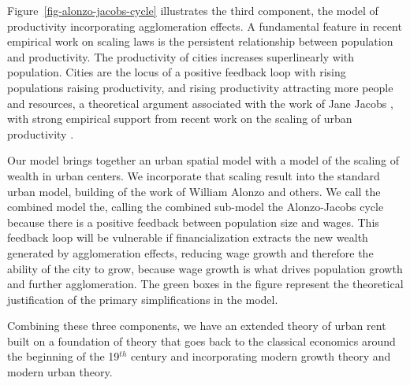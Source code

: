 Figure~\ref{fig-alonzo-jacobs-cycle} illustrates the third component, the model of productivity incorporating agglomeration effects. %
A fundamental feature in recent empirical work on scaling laws is %
the persistent relationship between population and productivity. The productivity of cities increases superlinearly with population. Cities are the locus of a positive feedback loop with rising populations raising productivity, and rising productivity attracting more people and resources, a theoretical argument associated with the work of Jane Jacobs \cite{jacobsEconomyCities1969}, with strong empirical support from recent work on the scaling of urban productivity  \cite{bettencourtGrowthInnovationScaling2007, bettencourtOriginsScalingCities2013, dongUnderstandingMesoscopicScaling2020, loboUrbanScalingProduction2013}.

Our model brings together an urban spatial model with a model of the scaling of wealth in urban centers. %
We incorporate that scaling result into the standard urban model, building of the work of William Alonzo and others. %
We call the combined model the\cite{alonzoTheoryUrbanLand1960}, calling the combined sub-model the 
\gls{Alonzo-Jacobs cycle} because there is a positive feedback between population size and wages. This feedback loop will be vulnerable if financialization extracts the new wealth generated by agglomeration effects, reducing wage growth and therefore the ability of the city to grow, because wage growth is what drives population growth and further agglomeration.
The green boxes in the figure represent the theoretical justification of the primary simplifications in the model. 

Combining these three components, we have an extended theory of urban rent built on a foundation of theory that goes back to the \gls{classical economics} around the beginning of the 19$^{th}$ century and incorporating modern growth theory and modern urban theory. 

